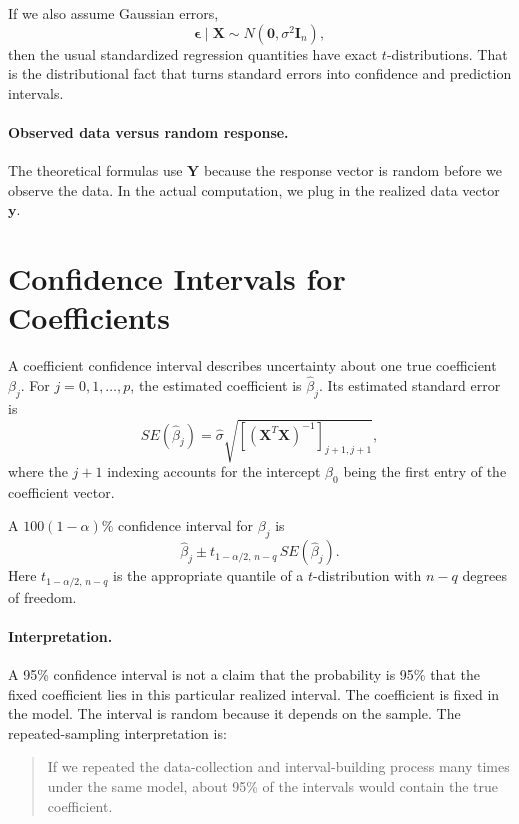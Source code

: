 If we also assume Gaussian errors,
\begin{equation}
  \boldsymbol{\epsilon}\mid \mathbf{X}\sim N(\mathbf{0},\sigma^2\mathbf{I}_n),
\end{equation}
then the usual standardized regression quantities have exact \(t\)-distributions.  That is the distributional fact that turns standard errors into confidence and prediction intervals.

\paragraph{Observed data versus random response.}
The theoretical formulas use \(\mathbf{Y}\) because the response vector is random before we observe the data.  In the actual computation, we plug in the realized data vector \(\mathbf{y}\).

\section{Confidence Intervals for Coefficients}

A coefficient confidence interval describes uncertainty about one true coefficient \(\beta_j\).  For \(j=0,1,\ldots,p\), the estimated coefficient is \(\widehat{\beta}_j\).  Its estimated standard error is
\begin{equation}
  SE(\widehat{\beta}_j)
  =\widehat{\sigma}\sqrt{\left[(\mathbf{X}^T\mathbf{X})^{-1}\right]_{j+1,j+1}},
  \label{eq:ch13-beta-se}
\end{equation}
where the \(j+1\) indexing accounts for the intercept \(\beta_0\) being the first entry of the coefficient vector.

A \(100(1-\alpha)\%\) confidence interval for \(\beta_j\) is
\begin{equation}
  \boxed{
  \widehat{\beta}_j
  \pm
  t_{1-\alpha/2,\,n-q}\,SE(\widehat{\beta}_j).
  }
  \label{eq:ch13-beta-ci}
\end{equation}
Here \(t_{1-\alpha/2,\,n-q}\) is the appropriate quantile of a \(t\)-distribution with \(n-q\) degrees of freedom.

\paragraph{Interpretation.}
A 95\% confidence interval is not a claim that the probability is 95\% that the fixed coefficient lies in this particular realized interval.  The coefficient is fixed in the model.  The interval is random because it depends on the sample.  The repeated-sampling interpretation is:
\begin{quote}
  If we repeated the data-collection and interval-building process many times under the same model, about 95\% of the intervals would contain the true coefficient.
\end{quote}

